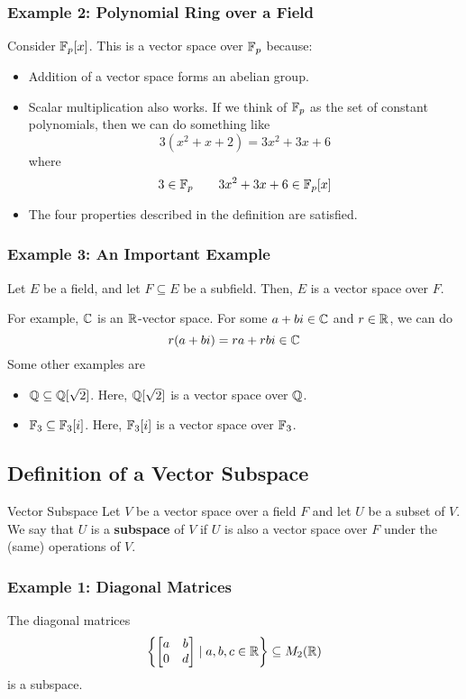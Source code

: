 \documentclass[letterpaper]{article}
\begin{document}
\subsubsection{Example 2: Polynomial Ring over a Field}
Consider $\mathbb{F}_{p}[x]$. This is a vector space over $\mathbb{F}_{p}$ because: 
\begin{itemize}
    \item Addition of a vector space forms an abelian group.
    \item Scalar multiplication also works. If we think of $\mathbb{F}_p$ as the set of constant polynomials, then we can do something like 
    \[3(x^2 + x + 2) = 3x^2 + 3x + 6\]
    where 
    \[3 \in \mathbb{F}_p \qquad 3x^2 + 3x + 6 \in \mathbb{F}_{p}[x]\]
    \item The four properties described in the definition are satisfied. 
\end{itemize}

\subsubsection{Example 3: An Important Example}
Let $E$ be a field, and let $F \subseteq E$ be a subfield. Then, $E$ is a vector space over $F$. 

\bigskip 

For example, $\mathbb{C}$ is an $\mathbb{R}$-vector space. For some $a + bi \in \mathbb{C}$ and $r \in \mathbb{R}$, we can do 
\[r(a + bi) = ra + rbi \in \mathbb{C}\]
Some other examples are 
\begin{itemize}
    \item $\mathbb{Q} \subseteq \mathbb{Q}[\sqrt{2}]$. Here, $\mathbb{Q}[\sqrt{2}]$ is a vector space over $\mathbb{Q}$.
    \item $\mathbb{F}_3 \subseteq \mathbb{F}_{3}[i]$. Here, $\mathbb{F}_{3}[i]$ is a vector space over $\mathbb{F}_3$. 
\end{itemize}


\subsection{Definition of a Vector Subspace}
\begin{definition}{Vector Subspace}{}
    Let $V$ be a vector space over a field $F$ and let $U$ be a subset of $V$. We say that $U$ is a \textbf{subspace} of $V$ if $U$ is also a vector space over $F$ under the (same) operations of $V$.
\end{definition}

\subsubsection{Example 1: Diagonal Matrices}
The diagonal matrices 
\[\left\{\begin{bmatrix}
    a & b \\ 0 & d 
\end{bmatrix} \mid a, b, c \in \mathbb{R} \right\} \subseteq M_{2}(\mathbb{R})\]
is a subspace. 
\end{document}

